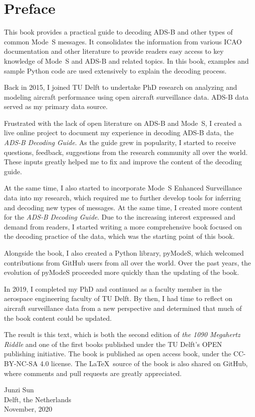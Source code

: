 \chapter*{Preface}

This book provides a practical guide to decoding ADS-B and other types of common Mode~S messages. It consolidates the information from various ICAO documentation and other literature to provide readers easy access to key knowledge of Mode~S and ADS-B and related topics. In this book, examples and sample Python code are used extensively to explain the decoding process.

Back in 2015, I joined TU Delft to undertake PhD research on analyzing and modeling aircraft performance using open aircraft surveillance data. ADS-B data served as my primary data source.

Frustrated with the lack of open literature on ADS-B and Mode~S, I created a live online project to document my experience in decoding ADS-B data, the \emph{ADS-B Decoding Guide}. As the guide grew in popularity, I started to receive questions, feedback, suggestions from the research community all over the world. These inputs greatly helped me to fix and improve the content of the decoding guide.

At the same time, I also started to incorporate Mode~S Enhanced Surveillance data into my research, which required me to further develop tools for inferring and decoding new types of messages. At the same time, I created more content for the \emph{ADS-B Decoding Guide}. Due to the increasing interest expressed and demand from readers, I started writing a more comprehensive book focused on the decoding practice of the data, which was the starting point of this book.

Alongside the book, I also created a Python library, pyModeS, which welcomed contributions from GitHub users from all over the world. Over the past years, the evolution of pyModeS proceeded more quickly than the updating of the book. 

In 2019, I completed my PhD and continued as a faculty member in the aerospace engineering faculty of TU Delft. By then, I had time to reflect on aircraft surveillance data from a new perspective and determined that much of the book content could be updated.

The result is this text, which is both the second edition of \emph{the 1090 Megahertz Riddle} and one of the first books published under the TU Delft's OPEN publishing initiative. The book is published as open access book, under the CC-BY-NC-SA 4.0 license. The \LaTeX~source of the book is also shared on GitHub, where comments and pull requests are greatly appreciated.

\vspace{0.5cm}

\begin{flushright}
  Junzi Sun \\
  Delft, the Netherlands \\
  November, 2020
\end{flushright}
